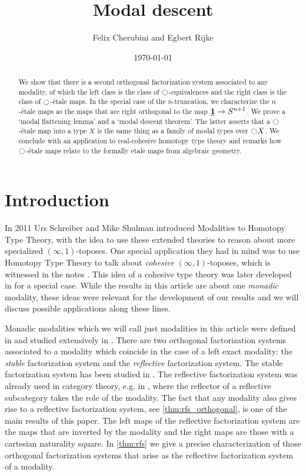 \documentclass[9pt,twosided]{amsart}
\title{Modal descent}
\author{Felix Cherubini and Egbert Rijke}
\date{\today}
\begin{document}
\maketitle

\begin{abstract}
  We show that there is a second orthogonal factorization system associated to any modality, of which the left class is the class of ${\ocircle}$-equivalences and the right class is the class of ${\ocircle}$-\'etale maps. In the special case of the $n$-truncation, we characterize the $n$-\'etale maps as the maps that are right orthogonal to the map $\underline{\mathbf{1}} \to S^{n+1}$. We prove a `modal flattening lemma' and a `modal descent theorem'. The latter asserts that a ${\ocircle}$-\'etale map into a type $X$ is the same thing as a family of modal types over ${\ocircle} X$. We conclude with an application to real-cohesive homotopy type theory and remarks how ${\ocircle}$-étale maps relate to the formally etale maps from algebraic geometry. 
\end{abstract}

\section{Introduction}
In 2011 Urs Schreiber and Mike Shulman introduced Modalities to Homotopy Type Theory,
with the idea to use these extended theories to reason about more specialized $(\infty,1)$-toposes.
One special application they had in mind was to use Homotopy Type Theory to talk about \emph{cohesive} $(\infty,1)$-toposes,
which is witnessed in the notes \cite{ShulmanSchreiber}.
This idea of a cohesive type theory was later developed in \cite{ShulmanRealCohesion} for a special case.
While the results in this article are about one \emph{monadic} modality,
these ideas were relevant for the development of our results and we will discuss possible applications along these lines.
  
Monadic modalities which we will call just modalities in this article were defined in \cite[Section 7.7]{UFP} and studied extensively in \cite{RijkeSpittersShulman}.
There are two orthogonal factorization systems associated to a modality which coincide in the case of a left exact modality:
the \emph{stable} factorization system and the \emph{reflective} factorization system.
The stable factorization system has been studied in \cite{RijkeSpittersShulman}.
The reflective factorization system was already used in category theory, e.g. in \cite{cassidy_hebert_kelly_1985},
where the reflector of a reflective subcategory takes the role of the modality.
The fact that any modality also gives rise to a reflective factorization system, see \cref{thm:rfs_orthogonal}, is one of the main results of this paper. The left maps of the reflective factorization system are the maps that are inverted by the modality and the right maps are those with a cartesian naturality square. In \cref{thm:rfs} we give a precise characterization of those orthogonal factorization systems that arise as the reflective factorization system of a modality.
\end{document}
